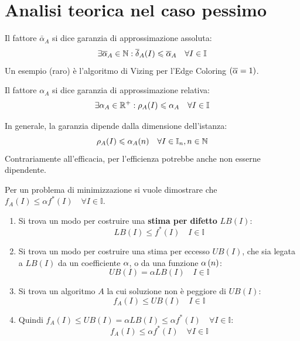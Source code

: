 \documentclass[\main/main.tex]{subfiles}
\begin{document}
\section{Analisi teorica nel caso pessimo}
\begin{multicols}{2}
\begin{definition}
Il fattore \(\bar{\alpha}_A\) si dice garanzia di approssimazione assoluta:
\[
    \exists \overline{\alpha}_{A} \in \mathbb{N}: \overline{\delta}_A(I) \leqslant \overline{\alpha}_A \quad \forall I \in \mathbb{I}
\]
Un esempio (raro) è l'algoritmo di Vizing per l'Edge Coloring \(\left(\overline{\alpha} = 1\right)\).
\end{definition}
\begin{definition}
Il fattore \(\alpha_A\) si dice garanzia di approssimazione relativa:
\[
    \exists \alpha_A \in \mathbb{R}^+: \rho_A(I) \leqslant \alpha_A \quad \forall I \in \mathbb{I}
\]
\end{definition}
\begin{observation}
    In generale, la garanzia dipende dalla dimensione dell'istanza:
    \[
        \rho_A(I) \leqslant \alpha_A(n) \quad \forall I \in \mathbb{I}_n, n \in \mathbb{N}
    \]
    Contrariamente all'efficacia, per l'efficienza potrebbe anche non esserne dipendente.
\end{observation}
\begin{analysis}
    Per un problema di minimizzazione si vuole dimostrare che \(f_A(I) \leq \alpha f^*(I) \quad \forall I \in \mathbb{I}\).
\begin{enumerate}
    \item Si trova un modo per costruire una \textbf{stima per difetto} \(LB(I)\):
    \[
        LB(I) \leq f^*(I) \quad I \in \mathbb{I}
    \]
    \item Si trova un modo per costruire una stima per eccesso \(UB(I)\), che sia legata a \(LB(I)\) da un coefficiente \(\alpha\), o da una funzione \(\alpha\left(n\right)\):
    \[
        UB(I) = \alpha LB(I) \quad I \in \mathbb{I}
    \]
    \item Si trova un algoritmo \(A\) la cui soluzione non è peggiore di \(UB(I)\):
    \[
        f_A(I) \leq UB(I) \quad I \in \mathbb{I}
    \]
    \item Quindi \(f_A(I) \leq UB(I) = \alpha LB(I) \leq \alpha f^*(I) \quad \forall I \in \mathbb{I}\):
    \[
        f_A(I) \leq \alpha f^* (I) \quad \forall I \in \mathbb{I}
    \]
\end{enumerate}
\end{analysis}
\end{multicols}
\clearpage
\end{document}
